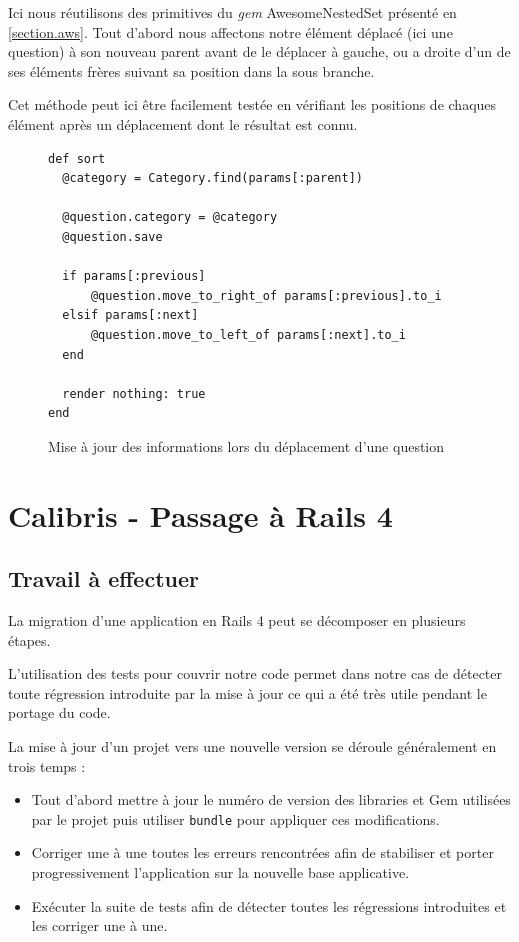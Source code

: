 \documentclass[12pt,a4paper]{book}
\begin{document}
Ici nous réutilisons des primitives du \textit{gem} AwesomeNestedSet présenté en \cref{section.aws}. Tout d'abord nous affectons notre élément déplacé (ici une question) à son nouveau parent avant de le déplacer à gauche, ou a droite d'un de ses éléments frères suivant sa position dans la sous branche.

Cet méthode peut ici être facilement testée en vérifiant les positions de chaques élément après un déplacement dont le résultat est connu.

\begin{figure}[h]
\lstset{language=ruby}
\begin{lstlisting}
def sort
  @category = Category.find(params[:parent])

  @question.category = @category
  @question.save

  if params[:previous]
      @question.move_to_right_of params[:previous].to_i
  elsif params[:next]
      @question.move_to_left_of params[:next].to_i
  end

  render nothing: true
end
\end{lstlisting}
 \caption{Mise à jour des informations lors du déplacement d'une question}
 \label{fig.sort3}
\end{figure}

\section{Calibris - Passage à Rails 4} 

\subsection{Travail à effectuer}

La migration d'une application en Rails 4 peut se décomposer en plusieurs étapes. 

L'utilisation des tests pour couvrir notre code permet dans notre cas de détecter toute régression introduite par la mise à jour ce qui a été très utile pendant le portage du code.

La mise à jour d'un projet vers une nouvelle version se déroule généralement en trois temps :
\begin{itemize}
  \item Tout d'abord mettre à jour le numéro de version des libraries et Gem utilisées par le projet puis utiliser \texttt{bundle} pour appliquer ces modifications.
  \item Corriger une à une toutes les erreurs rencontrées afin de stabiliser et porter progressivement l'application sur la nouvelle base applicative.
  \item Exécuter la suite de tests afin de détecter toutes les régressions introduites et les corriger une à une.
\end{itemize}
\end{document}
